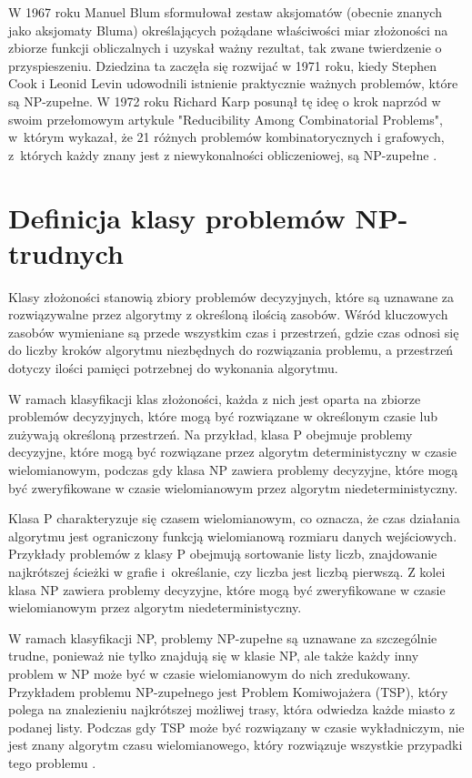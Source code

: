 W 1967 roku Manuel Blum sformułował zestaw aksjomatów (obecnie znanych jako aksjomaty Bluma) określających pożądane właściwości miar złożoności na zbiorze funkcji obliczalnych i uzyskał ważny rezultat, tak zwane twierdzenie o przyspieszeniu. Dziedzina ta zaczęła się rozwijać w 1971 roku, kiedy Stephen Cook i Leonid Levin udowodnili istnienie praktycznie ważnych problemów, które są NP-zupełne. W 1972 roku Richard Karp posunął tę ideę o krok naprzód w swoim przełomowym artykule "Reducibility Among Combinatorial Problems", w~którym wykazał, że 21 różnych problemów kombinatorycznych i grafowych, z~których każdy znany jest z niewykonalności obliczeniowej, są NP-zupełne \cite{Karp86}.

\section{Definicja klasy problemów NP-trudnych}

Klasy złożoności stanowią zbiory problemów decyzyjnych, które są uznawane za rozwiązywalne przez algorytmy z określoną ilością zasobów. Wśród kluczowych zasobów wymieniane są przede wszystkim czas i przestrzeń, gdzie czas odnosi się do liczby kroków algorytmu niezbędnych do rozwiązania problemu, a przestrzeń dotyczy ilości pamięci potrzebnej do wykonania algorytmu.

W ramach klasyfikacji klas złożoności, każda z nich jest oparta na zbiorze problemów decyzyjnych, które mogą być rozwiązane w określonym czasie lub zużywają określoną przestrzeń. Na przykład, klasa P obejmuje problemy decyzyjne, które mogą być rozwiązane przez algorytm deterministyczny w czasie wielomianowym, podczas gdy klasa NP zawiera problemy decyzyjne, które mogą być zweryfikowane w czasie wielomianowym przez algorytm niedeterministyczny.

Klasa P charakteryzuje się czasem wielomianowym, co oznacza, że czas działania algorytmu jest ograniczony funkcją wielomianową rozmiaru danych wejściowych. Przykłady problemów z klasy P obejmują sortowanie listy liczb, znajdowanie najkrótszej ścieżki w grafie i~określanie, czy liczba jest liczbą pierwszą. Z kolei klasa NP zawiera problemy decyzyjne, które mogą być zweryfikowane w czasie wielomianowym przez algorytm niedeterministyczny.

W ramach klasyfikacji NP, problemy NP-zupełne są uznawane za szczególnie trudne, ponieważ nie tylko znajdują się w klasie NP, ale także każdy inny problem w NP może być w czasie wielomianowym do nich zredukowany. Przykładem problemu NP-zupełnego jest Problem Komiwojażera (TSP), który polega na znalezieniu najkrótszej możliwej trasy, która odwiedza każde miasto z podanej listy. Podczas gdy TSP może być rozwiązany w czasie wykładniczym, nie jest znany algorytm czasu wielomianowego, który rozwiązuje wszystkie przypadki tego problemu \cite{medium:complexity-classes}.


